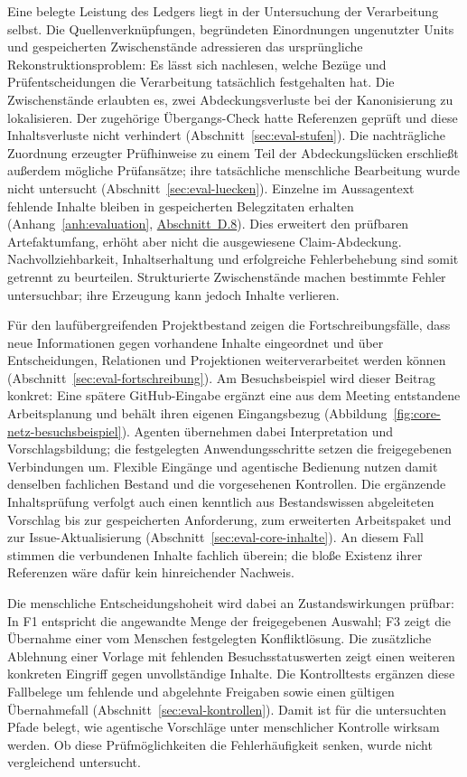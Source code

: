 Eine belegte Leistung des Ledgers liegt in der Untersuchung der
Verarbeitung selbst. Die Quellenverknüpfungen, begründeten
Einordnungen ungenutzter Units und gespeicherten Zwischenstände
adressieren das ursprüngliche Rekonstruktionsproblem: Es lässt
sich nachlesen, welche Bezüge und Prüfentscheidungen die
Verarbeitung tatsächlich festgehalten hat. Die Zwischenstände erlaubten es, zwei
Abdeckungsverluste bei der Kanonisierung zu lokalisieren. Der zugehörige
Übergangs-Check hatte Referenzen geprüft und diese Inhaltsverluste nicht
verhindert (Abschnitt~\ref{sec:eval-stufen}). Die nachträgliche Zuordnung erzeugter Prüfhinweise
zu einem Teil der Abdeckungslücken erschließt außerdem mögliche Prüfansätze;
ihre tatsächliche menschliche Bearbeitung wurde nicht untersucht
(Abschnitt~\ref{sec:eval-luecken}). Einzelne im Aussagentext fehlende Inhalte bleiben in gespeicherten
Belegzitaten erhalten (Anhang~\ref{anh:evaluation},
\hyperref[anh:coverage-nachreview]{Abschnitt~D.8}).
Dies erweitert den prüfbaren Artefaktumfang, erhöht aber nicht die
ausgewiesene Claim-Abdeckung. Nachvollziehbarkeit, Inhaltserhaltung
und erfolgreiche Fehlerbehebung sind somit getrennt zu beurteilen.
Strukturierte Zwischenstände machen bestimmte Fehler untersuchbar;
ihre Erzeugung kann jedoch Inhalte verlieren.

Für den laufübergreifenden Projektbestand zeigen die Fortschreibungsfälle,
dass neue Informationen gegen vorhandene Inhalte eingeordnet und über
Entscheidungen, Relationen und Projektionen weiterverarbeitet werden können
(Abschnitt~\ref{sec:eval-fortschreibung}). Am Besuchsbeispiel wird
dieser Beitrag konkret: Eine spätere GitHub-Eingabe ergänzt eine aus
dem Meeting entstandene Arbeitsplanung und behält ihren eigenen
Eingangsbezug (Abbildung~\ref{fig:core-netz-besuchsbeispiel}).
Agenten übernehmen dabei Interpretation und Vorschlagsbildung;
die festgelegten Anwendungsschritte setzen die freigegebenen
Verbindungen um. Flexible Eingänge und agentische Bedienung nutzen
damit denselben fachlichen Bestand und die vorgesehenen Kontrollen.
Die ergänzende Inhaltsprüfung verfolgt auch einen kenntlich aus
Bestandswissen abgeleiteten Vorschlag bis zur gespeicherten Anforderung,
zum erweiterten Arbeitspaket und zur Issue-Aktualisierung
(Abschnitt~\ref{sec:eval-core-inhalte}). An diesem Fall stimmen
die verbundenen Inhalte fachlich überein; die bloße Existenz ihrer
Referenzen wäre dafür kein hinreichender Nachweis.

Die menschliche Entscheidungshoheit wird dabei an Zustandswirkungen
prüfbar: In F1 entspricht die angewandte Menge der freigegebenen
Auswahl; F3 zeigt die Übernahme einer vom Menschen festgelegten
Konfliktlösung. Die zusätzliche Ablehnung einer Vorlage mit fehlenden
Besuchsstatuswerten zeigt einen weiteren konkreten Eingriff gegen
unvollständige Inhalte. Die Kontrolltests ergänzen diese Fallbelege um
fehlende und abgelehnte Freigaben sowie einen gültigen Übernahmefall
(Abschnitt~\ref{sec:eval-kontrollen}). Damit ist für die untersuchten
Pfade belegt, wie agentische Vorschläge unter menschlicher Kontrolle
wirksam werden. Ob diese Prüfmöglichkeiten die Fehlerhäufigkeit
senken, wurde nicht vergleichend untersucht.

